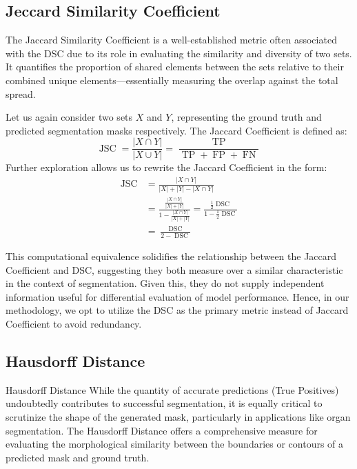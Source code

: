 \subsection{Jeccard Similarity Coefficient}

The Jaccard Similarity Coefficient is a well-established metric often associated with the DSC due to its role in evaluating the similarity and diversity of two sets. It quantifies the proportion of shared elements between the sets relative to their combined unique elements—essentially measuring the overlap against the total spread.

Let us again consider two sets \(X\) and \(Y\), representing the ground truth and predicted segmentation masks respectively. The Jaccard Coefficient is defined as:
\[
\operatorname*{JSC} = \frac{|X \cap Y|}{|X\cup Y|} = \frac{\operatorname*{TP}}{\operatorname*{TP} + \operatorname*{FP} + \operatorname*{FN}}
\]
Further exploration allows us to rewrite the Jaccard Coefficient in the form:
\begin{align*}
    \operatorname*{JSC} &= \frac{|X \cap Y|}{|X| + |Y| - |X \cap Y|} \\
    &= \frac{\frac{|X \cap Y|}{|X| + |Y|}}{1 - \frac{|X \cap Y|}{|X| + |Y|}} = \frac{\frac{1}{2}\operatorname*{DSC}}{1 - \frac{1}{2}\operatorname*{DSC}} \\
    &= \frac{\operatorname*{DSC}}{2 - \operatorname*{DSC}}
\end{align*}

This computational equivalence solidifies the relationship between the Jaccard Coefficient and DSC, suggesting they both measure over a similar characteristic in the context of segmentation. Given this, they do not supply independent information useful for differential evaluation of model performance. Hence, in our methodology, we opt to utilize the DSC as the primary metric instead of Jaccard Coefficient to avoid redundancy.

\subsection{Hausdorff Distance}

Hausdorff Distance
While the quantity of accurate predictions (True Positives) undoubtedly contributes to successful segmentation, it is equally critical to scrutinize the shape of the generated mask, particularly in applications like organ segmentation. The Hausdorff Distance offers a comprehensive measure for evaluating the morphological similarity between the boundaries or contours of a predicted mask and ground truth.

